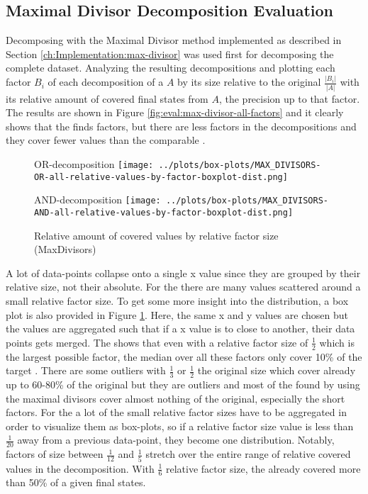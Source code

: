 \subsection{Maximal Divisor Decomposition Evaluation}
Decomposing with the Maximal Divisor method implemented as described in Section \ref{ch:Implementation:max-divisor} was used first for decomposing the complete dataset. Analyzing the resulting decompositions and plotting each factor $B_i$ of each decomposition of a \DFA $A$ by its size relative to the original $\frac{|B_i|}{|A|}$ with its relative amount of covered final states from $A$, the precision up to that factor. The results are shown in Figure \ref{fig:eval:max-divisor-all-factors} and it clearly shows that the \orDecomp finds factors, but there are less factors in the decompositions and they cover fewer values than the comparable \andDecomp.
\begin{figure}[h]
	\begin{minipage}[h]{0.49\linewidth}
		\centering
		OR-decomposition
		\texttt{[image: ../plots/box-plots/MAX\_DIVISORS-OR-all-relative-values-by-factor-boxplot-dist.png]}
	\end{minipage}
	\begin{minipage}[h]{0.49\linewidth}
		\centering
		AND-decomposition
		\texttt{[image: ../plots/box-plots/MAX\_DIVISORS-AND-all-relative-values-by-factor-boxplot-dist.png]}
	\end{minipage}
	\caption{Relative amount of covered values by relative factor size (MaxDivisors)}
	\label{fig:eval:max-divisor-all-factors-box-plot}
\end{figure}
A lot of data-points collapse onto a single x value since they are grouped by their relative size, not their absolute. For the \andDecomp there are many values scattered around a small relative factor size. To get some more insight into the distribution, a box plot is also provided in Figure \ref{fig:eval:max-divisor-all-factors-box-plot}. Here, the same x and y values are chosen but the values are aggregated such that if a x value is to close to another, their data points gets merged. The \orDecomp shows that even with a relative factor size of $\frac{1}{2}$ which is the largest possible factor, the median over all these factors only cover 10\% of the target \DFA. There are some outliers with $\frac{1}{3}$ or $\frac{1}{2}$ the original size which cover already up to 60-80\% of the original \DFA but they are outliers and most of the \orDecomp found by using the maximal divisors cover almost nothing of the original, especially the short factors. For the \andDecomp a lot of the small relative factor sizes have to be aggregated in order to visualize them as box-plots, so if a relative factor size value is less than $\frac{1}{20}$ away from a previous data-point, they become one distribution. Notably, factors of size between $\frac{1}{12}$ and $\frac{1}{5}$ stretch over the entire range of relative covered values in the decomposition. With $\frac{1}{6}$ relative factor size, the \andDecomp already covered more than 50\% of a given \DFAs final states.

